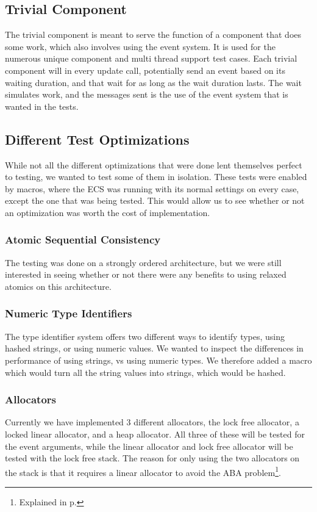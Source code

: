\subsection{Trivial Component}
The trivial component is meant to serve the function of a component that does some work, which also involves using the event system.
It is used for the numerous unique component and multi thread support test cases.
Each trivial component will in every update call, potentially send an event based on its waiting duration, and that wait for as long as the wait duration lasts.
The wait simulates work, and the messages sent is the use of the event system that is wanted in the tests.


\subsection{Different Test Optimizations}
While not all the different optimizations that were done lent themselves perfect to testing, we
wanted to test some of them in isolation.
These tests were enabled by macros, where the ECS was running with its normal settings on
every case, except the one that was being tested.
This would allow us to see whether or not an optimization was worth the cost of implementation.

\subsubsection{Atomic Sequential Consistency}
The testing was done on a strongly ordered architecture, but we were still interested
in seeing whether or not there were any benefits to using relaxed atomics
on this architecture.

\subsubsection{Numeric Type Identifiers}
The type identifier system offers two different ways to identify types, using
hashed strings, or using numeric values.
We wanted to inspect the differences in performance of using strings, vs
using numeric types. We therefore added a macro which would turn
all the string values into strings, which would be hashed.

\subsubsection{Allocators}
Currently we have implemented 3 different allocators, the lock free allocator,
a locked linear allocator, and a heap allocator.
All three of these will be tested for the event arguments, while the
linear allocator and lock free allocator will be tested with the lock free stack.
The reason for only using the two allocators on the stack is that it requires
a linear allocator to avoid the ABA problem\footnote{Explained in p.\pageref{subpar:detailed_lock_free_allocator_aba}}.

